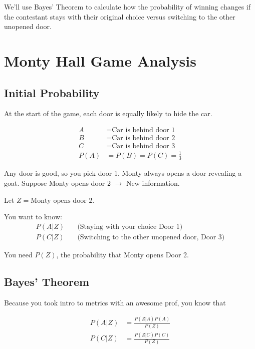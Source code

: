 \documentclass{article}
\begin{document}
We'll use Bayes' Theorem to calculate how the probability of winning changes if the contestant stays with their original choice versus switching to the other unopened door.

\section{Monty Hall Game Analysis}

\subsection{Initial Probability}

At the start of the game, each door is equally likely to hide the car.

\begin{align*}
    A &= \text{Car is behind door 1} \\
    B &= \text{Car is behind door 2} \\
    C &= \text{Car is behind door 3} \\
    P(A) &= P(B) = P(C) = \frac{1}{3} 
\end{align*}

Any door is good, so you pick door 1.
Monty always opens a door revealing a goat. Suppose Monty opens door 2 $\rightarrow$ New information.

Let $Z=\text{Monty opens door 2}$.

You want to know:
\begin{align*}
    P(A|Z) &\quad \text{(Staying with your choice Door 1)} \\
    P(C|Z) &\quad \text{(Switching to the other unopened door, Door 3)}
\end{align*}

You need $P(Z)$, the probability that Monty opens Door 2.

\subsection{Bayes' Theorem}

Because you took intro to metrics with an awesome prof, you know that

\begin{align*}
    P(A|Z) &= \frac{P(Z|A)P(A)}{P(Z)} \\
    P(C|Z) &= \frac{P(Z|C)P(C)}{P(Z)}
\end{align*}
\end{document}
